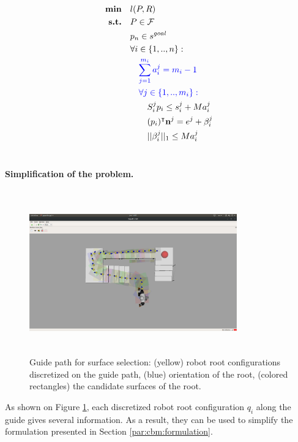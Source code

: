 \begin{align}
    \textrm{\textbf{min}}  \quad & l(P,R) \nonumber\\
    \textrm{\textbf{s.t.}}  \quad & P \in \mathcal{F} \nonumber\\
                            \quad & p_n \in s^{goal} \nonumber\\
                            \quad & \forall i \in \{1,..,n\} : \nonumber\\
                                \quad & \quad \textcolor{blue}{\sum_{j=1}^{m_i} a_i^j = m_i-1} \label{eq:mbc:mip_complete:card_pruned}\\
                                \quad & \quad \textcolor{blue}{\forall j \in \{1,..,m_i\} :} \nonumber\\
                                    \quad & \quad \quad S_i^j p_i \leq s_i^j + M a_i^j  \nonumber\\
                                    \quad & \quad \quad (p_i)^{\intercal} \textbf{n}^j = e^j + \beta_i^j \nonumber\\
                                    \quad & \quad \quad ||\beta_i^j||_1 \leq M a_i^j \nonumber\\
                                    \nonumber
\end{align}

\paragraph{Simplification of the problem.}
\begin{figure}[h!]
    \centering
    \captionsetup[subfigure]{justification=centering}
    \includegraphics[trim={15cm 5cm 18cm 7cm},clip,width=0.8\textwidth,height=7cm]{Figures/Chapter_MIP_SL1M/bauzil_guide_surfaces.png}
    \caption{Guide path for surface selection: (yellow) robot root configurations discretized on the guide path, (blue) orientation of the root, (colored rectangles) the candidate surfaces of the root.\label{fig:mip:bauzil_guide_surfaces}}
\end{figure}
As shown on Figure \ref{fig:mip:bauzil_guide_surfaces}, each discretized robot root configuration $q_i$ along the guide gives several information. As a result, they can be used to simplify the formulation presented in Section \ref{par:cbm:formulation}.

